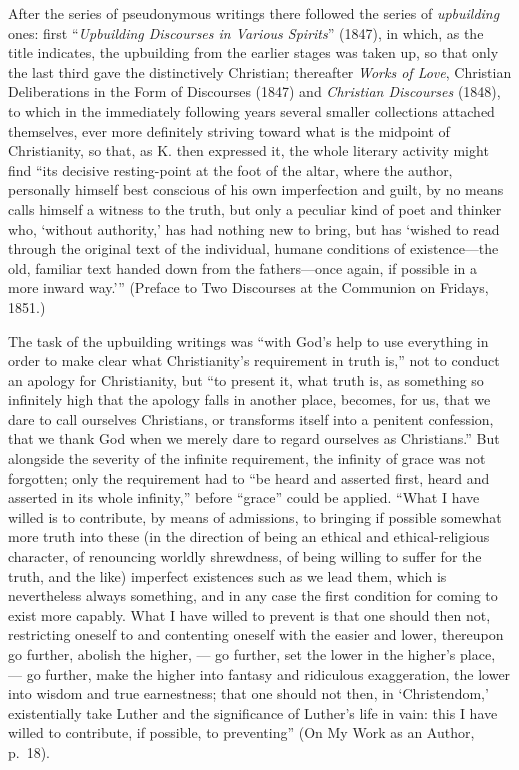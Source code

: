 \documentclass[12pt,a4paper]{article}
\begin{document}
After the series of pseudonymous writings there followed the series of \emph{upbuilding}
ones: first ``\emph{Upbuilding Discourses in Various Spirits}'' (1847), in which, as the
title indicates, the upbuilding from the earlier stages was taken up, so that only
the last third gave the distinctively Christian; thereafter \emph{Works of Love},
Christian Deliberations in the Form of Discourses (1847) and \emph{Christian
Discourses} (1848), to which in the immediately following years several smaller
collections attached themselves, ever more definitely striving toward what is the
midpoint of Christianity, so that, as K. then expressed it, the whole literary
activity might find ``its decisive resting-point at the foot of the altar, where
the author, personally himself best conscious of his own imperfection and guilt, by no means
calls himself a witness to the truth, but only a peculiar kind of poet and thinker
who, `without authority,' has had nothing new to bring, but has `wished to read
through the original text of the individual, humane conditions of existence---the
old, familiar text handed down from the fathers---once again, if possible in a
more inward way.''' (Preface to Two Discourses at the Communion on Fridays, 1851.)

The task of the upbuilding writings was ``with God's help to use everything in
order to make clear what Christianity's requirement in truth is,'' not to conduct
an apology for Christianity, but ``to present it, what truth is, as something so
infinitely high that the apology falls in another place, becomes, for us, that we
dare to call ourselves Christians, or transforms itself into a penitent
confession, that we thank God when we merely dare to regard ourselves as
Christians.'' But alongside the severity of the infinite requirement, the infinity
of grace was not forgotten; only the requirement had to ``be heard and asserted
first, heard and asserted in its whole infinity,'' before ``grace'' could be
applied. ``What I have willed is to contribute, by means of admissions, to
bringing if possible somewhat more truth into these (in the direction of being an
ethical and ethical-religious character, of renouncing worldly shrewdness, of
being willing to suffer for the truth, and the like) imperfect existences such as
we lead them, which is nevertheless always something, and in any case the first
condition for coming to exist more capably. What I have willed to prevent is that
one should then not, restricting oneself to and contenting oneself with the easier
and lower, thereupon go further, abolish the higher, --- go further, set the lower
in the higher's place, --- go further, make the higher into fantasy and
ridiculous exaggeration, the lower into wisdom and true earnestness; that one
should not then, in `Christendom,' existentially take Luther and the significance
of Luther's life in vain: this I have willed to contribute, if possible, to
preventing'' (On My Work as an Author, p.\ 18).
\end{document}
